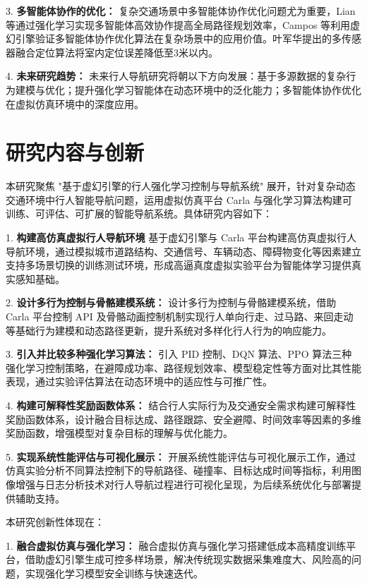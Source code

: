 3. \textbf{多智能体协作的优化：} 复杂交通场景中多智能体协作优化问题尤为重要，Lian 等\cite{lian2023inverseql}通过强化学习实现多智能体高效协作提高全局路径规划效率，Campos 等\cite{campos2021orbslam3}利用虚幻引擎验证多智能体协作优化算法在复杂场景中的应用价值。叶军华\cite{ye2023fusion}提出的多传感器融合定位算法将室内定位误差降低至3米以内。

4. \textbf{未来研究趋势：} 未来行人导航研究将朝以下方向发展：基于多源数据的复杂行为建模与优化；提升强化学习智能体在动态环境中的泛化能力；多智能体协作优化在虚拟仿真环境中的深度应用。

\section{研究内容与创新}

本研究聚焦 "基于虚幻引擎的行人强化学习控制与导航系统" 展开，针对复杂动态交通环境中行人智能导航问题，运用虚拟仿真平台 Carla 与强化学习算法构建可训练、可评估、可扩展的智能导航系统。具体研究内容如下：

1. \textbf{构建高仿真虚拟行人导航环境} 基于虚幻引擎与 Carla 平台构建高仿真虚拟行人导航环境，通过模拟城市道路结构、交通信号、车辆动态、障碍物变化等因素建立支持多场景切换的训练测试环境，形成高逼真度虚拟实验平台为智能体学习提供真实感知基础。

2. \textbf{设计多行为控制与骨骼建模系统：} 设计多行为控制与骨骼建模系统，借助 Carla 平台控制 API 及骨骼动画控制机制实现行人单向行走、过马路、来回走动等基础行为建模和动态路径更新，提升系统对多样化行人行为的响应能力。

3. \textbf{引入并比较多种强化学习算法：} 引入 PID 控制、DQN 算法、PPO 算法三种强化学习控制策略，在避障成功率、路径规划效率、模型稳定性等方面对比其性能表现，通过实验评估算法在动态环境中的适应性与可推广性。

4. \textbf{构建可解释性奖励函数体系：} 结合行人实际行为及交通安全需求构建可解释性奖励函数体系，设计融合目标达成、路径跟踪、安全避障、时间效率等因素的多维奖励函数，增强模型对复杂目标的理解与优化能力。

5. \textbf{实现系统性能评估与可视化展示：} 开展系统性能评估与可视化展示工作，通过仿真实验分析不同算法控制下的导航路径、碰撞率、目标达成时间等指标，利用图像增强与日志分析技术对行人导航过程进行可视化呈现，为后续系统优化与部署提供辅助支持。

本研究创新性体现在：

1. \textbf{融合虚拟仿真与强化学习：} 融合虚拟仿真与强化学习搭建低成本高精度训练平台，借助虚幻引擎生成可控多样场景，解决传统现实数据采集难度大、风险高的问题，实现强化学习模型安全训练与快速迭代。

